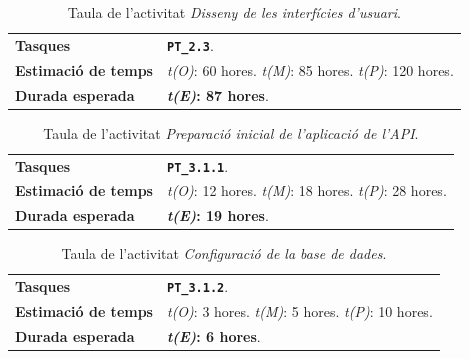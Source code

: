 \documentclass[a4paper,12pt]{ThesisStyle}
\begin{document}
\begin{table}[H]
  \begin{tabularx}{\textwidth}{l | X}
    \toprule
    \rowcolor{Green}
    \multicolumn{2}{c}{\texttt{\textbf{A5:}} Disseny de les interfícies d'usuari}\\
    \midrule[0.9pt]
    \textbf{Tasques}                 & \texttt{\textbf{PT\_2.3}}.\\
    \midrule
    \textbf{Estimació de temps}      & \textit{t(O)}: 60 hores.
    \newline \textit{t(M)}: 85 hores.
    \newline \textit{t(P)}: 120 hores.\\
    \midrule
    \textbf{Durada esperada}         & \textbf{\textit{t(E)}: 87 hores}.\\
    \bottomrule
  \end{tabularx}
  \caption{\label{taula:a5} Taula de l'activitat \emph{Disseny de les interfícies d'usuari}.}
\end{table}

\begin{table}[H]
  \begin{tabularx}{\textwidth}{l | X}
    \toprule
    \rowcolor{Blue}
    \multicolumn{2}{c}{\texttt{\textbf{A6:}} Preparació inicial de l'aplicació de l'API}\\
    \midrule[0.9pt]
    \textbf{Tasques}                 & \texttt{\textbf{PT\_3.1.1}}.\\
    \midrule
    \textbf{Estimació de temps}      & \textit{t(O)}: 12 hores.
    \newline \textit{t(M)}: 18 hores.
    \newline \textit{t(P)}: 28 hores.\\
    \midrule
    \textbf{Durada esperada}         & \textbf{\textit{t(E)}: 19 hores}.\\
    \bottomrule
  \end{tabularx}
  \caption{\label{taula:a6} Taula de l'activitat \emph{Preparació inicial de l'aplicació de l'API}.}
\end{table}

\begin{table}[H]
  \begin{tabularx}{\textwidth}{l | X}
    \toprule
    \rowcolor{Blue}
    \multicolumn{2}{c}{\texttt{\textbf{A7:}} Configuració de la base de dades}\\
    \midrule[0.9pt]
    \textbf{Tasques}                 & \texttt{\textbf{PT\_3.1.2}}.\\
    \midrule
    \textbf{Estimació de temps}      & \textit{t(O)}: 3 hores.
    \newline \textit{t(M)}: 5 hores.
    \newline \textit{t(P)}: 10 hores.\\
    \midrule
    \textbf{Durada esperada}         & \textbf{\textit{t(E)}: 6 hores}.\\
    \bottomrule
  \end{tabularx}
  \caption{\label{taula:a7} Taula de l'activitat \emph{Configuració de la base de dades}.}
\end{table}
\end{document}
